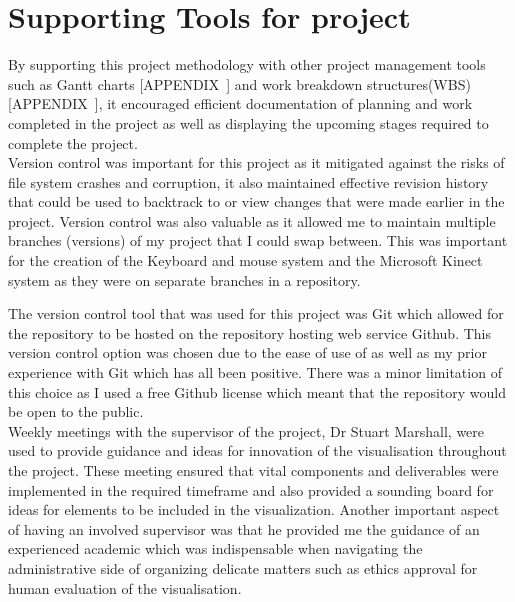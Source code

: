 \section{Supporting Tools for project}
By supporting this project methodology with other project management tools such
as Gantt charts [APPENDIX~] and work breakdown structures(WBS) [APPENDIX~], it
encouraged efficient documentation of planning and work completed in the project
as well as displaying the upcoming stages required to complete the project.
\\

Version control was important for this project as it mitigated against the risks
of file system crashes and corruption, it also maintained effective revision
history that could be used to backtrack to or view changes that were made
earlier in the project. Version control was also valuable as it allowed me to
maintain multiple branches (versions) of my project that I could swap between.
This was important for the creation of the Keyboard and mouse system and the
Microsoft Kinect system as they were on separate branches in a repository. 

The version control tool that was used for this project was Git which allowed
for the repository to be hosted on the repository hosting web service Github.
This version control option was chosen due to the ease of use of as well as my
prior experience with Git which has all been positive. There was a minor
limitation of this choice as I used a free Github license which meant that the
repository would be open to the public.
\\

Weekly meetings with the supervisor of the project, Dr Stuart Marshall, were
used to provide guidance and ideas for innovation of the visualisation
throughout the project. These meeting ensured that vital components and
deliverables were implemented in the required timeframe and also provided a
sounding board for ideas for elements to be included in the visualization.
Another important aspect of having an involved supervisor was that he provided
me the guidance of an experienced academic which was indispensable when
navigating the administrative side of organizing delicate matters such as ethics
approval for human evaluation of the visualisation.
